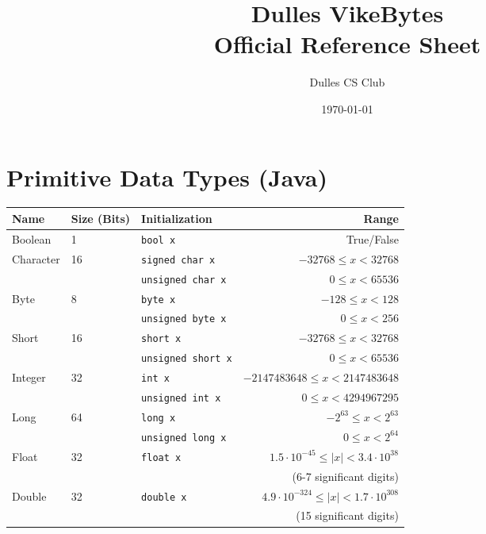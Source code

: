 \documentclass{article}
\title{Dulles VikeBytes\\Official Reference Sheet}
\date{\today}
\author{Dulles CS Club}
\begin{document}

{\let\newpage\relax\maketitle} %

\renewcommand{\arraystretch}{1.25} %
\section{Primitive Data Types (Java)}
\begin{center}\begin{tabular}{lllr}\toprule
  Name      &Size (Bits) &Initialization              &Range \\\midrule
  Boolean   &1           &\lstinline|bool x|          &True/False \\\midrule
  Character &16          &\lstinline|signed char x|   &\(-32768 \leq x < 32768\) \\ 
            &            &\lstinline|unsigned char x| &\(0 \leq x < 65536\) \\
  Byte      &8           &\lstinline|byte x|          &\(-128 \leq x < 128\) \\
            &            &\lstinline|unsigned byte x| &\(0 \leq x < 256\) \\
  Short     &16          &\lstinline|short x|         &\(-32768 \leq x < 32768\) \\
            &            &\lstinline|unsigned short x|&\(0 \leq x < 65536\) \\
  Integer   &32          &\lstinline|int x|           &\(-2147483648 \leq x < 2147483648\) \\
            &            &\lstinline|unsigned int x|  &\(0 \leq x < 4294967295\) \\
  Long      &64          &\lstinline|long x|          &\(-2^{63} \leq x < 2^{63}\) \\
            &            &\lstinline|unsigned long x| &\(0 \leq x < 2^{64}\) \\\midrule
  Float     &32          &\lstinline|float x|         &\(1.5\cdot10^{-45} \leq |x| < 3.4\cdot10^{38}\) \\
            &            &                            &(6-7 significant digits) \\
  Double    &32          &\lstinline|double x|        &\(4.9\cdot10^{-324} \leq |x| < 1.7\cdot10^{308}\) \\
            &            &                            &(15 significant digits) \\
\bottomrule\end{tabular}\end{center}
\end{document}
